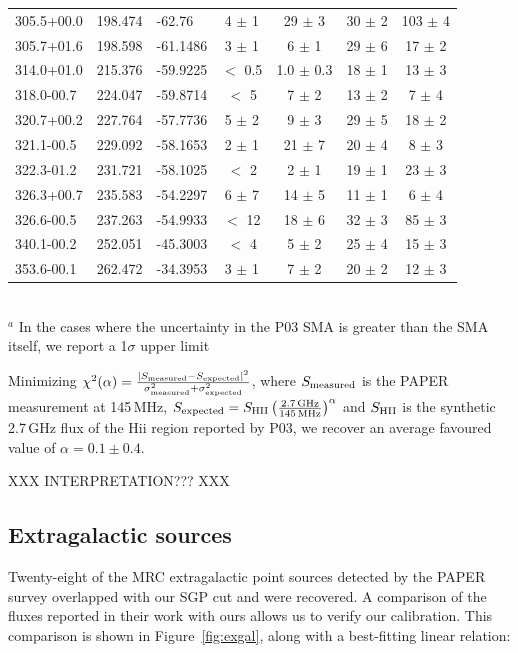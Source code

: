\documentclass[useAMS,usenatbib]{mn2e}
\begin{document}
\begin{table}
\begin{tabular}{lllcccc}
305.5+00.0	&	198.474	&	-62.76	&	4	$\pm$	1	&	29	$\pm$	3	&	30	$\pm$	2	&	103	$\pm$	4	\\
305.7+01.6	&	198.598	&	-61.1486	&	3	$\pm$	1	&	6	$\pm$	1	&	29	$\pm$	6	&	17	$\pm$	2	\\
314.0+01.0	&	215.376	&	-59.9225	&		$<$	0.5	&	1.0	$\pm$	0.3	&	18	$\pm$	1	&	13	$\pm$	3	\\
318.0-00.7	&	224.047	&	-59.8714	&		$<$	5	&	7	$\pm$	2	&	13	$\pm$	2	&	7	$\pm$	4	\\
320.7+00.2	&	227.764	&	-57.7736	&	5	$\pm$	2	&	9	$\pm$	3	&	29	$\pm$	5	&	18	$\pm$	2	\\
321.1-00.5	&	229.092	&	-58.1653	&	2	$\pm$	1	&	21	$\pm$	7	&	20	$\pm$	4	&	8	$\pm$	3	\\
322.3-01.2	&	231.721	&	-58.1025	&		$<$	2	&	2	$\pm$	1	&	19	$\pm$	1	&	23	$\pm$	3	\\
326.3+00.7	&	235.583	&	-54.2297	&	6	$\pm$	7	&	14	$\pm$	5	&	11	$\pm$	1	&	6	$\pm$	4	\\
326.6-00.5	&	237.263	&	-54.9933	&		$<$	12	&	18	$\pm$	6	&	32	$\pm$	3	&	85	$\pm$	3	\\
340.1-00.2	&	252.051	&	-45.3003	&		$<$	4	&	5	$\pm$	2	&	25	$\pm$	4	&	15	$\pm$	3	\\
353.6-00.1	&	262.472	&	-34.3953	&	3	$\pm$	1	&	7	$\pm$	2	&	20	$\pm$	2	&	12	$\pm$	3	\\
\hline
\end{tabular}
\\
$^a$ In the cases where the uncertainty in the P03 SMA is greater than the SMA itself, we report a 1$\sigma$ upper limit\\
\label{tab:hii}
\end{table}

Minimizing $\chi^2(\alpha) = \frac{|S_{\rm measured} - S_{\rm expected}|^2}{\sigma_{\rm measured}^2 + \sigma_{\rm expected}^2}$, where $S_{\rm measured}$ is the PAPER measurement at 145\,MHz,  $S_{\rm expected}=S_{\rm HII}\left(\frac{2.7\,{\rm GHz}}{145\,{\rm MHz}}\right)^{\alpha}$ and $S_{\rm HII}$ is the synthetic 2.7\,GHz flux of the H{\sc ii} region reported by P03, we recover an average favoured value of $\alpha=0.1\pm0.4$.

XXX INTERPRETATION??? XXX

\subsection{Extragalactic sources}

Twenty-eight of the MRC extragalactic point sources detected by the \cite{Jacobs.11} PAPER survey overlapped with our SGP cut and were recovered. A comparison of the fluxes reported in their work with ours allows us to verify our calibration. This comparison is shown in Figure~\ref{fig:exgal}, along with a best-fitting linear relation:
\end{document}
